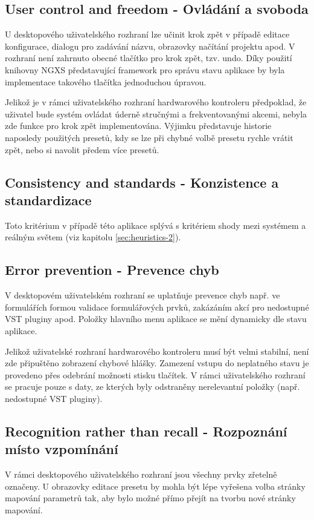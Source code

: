 \documentclass[thesis=M,czech]{FITthesis}[2019/03/06]
\begin{document}
		\subsection{User control and freedom - Ovládání a svoboda}
			U desktopového uživatelského rozhraní lze učinit krok zpět v případě editace konfigurace, dialogu pro zadávání názvu, obrazovky načítání projektu apod. V rozhraní není zahrnuto obecné tlačítko pro krok zpět, tzv. undo. Díky použití knihovny NGXS představující framework pro správu stavu aplikace by byla implementace takového tlačítka jednoduchou úpravou.
			
			Jelikož je v rámci uživatelského rozhraní hardwarového kontroleru předpoklad, že uživatel bude systém ovládat úderně stručnými a frekventovanými akcemi, nebyla zde funkce pro krok zpět implementována. Výjimku představuje historie naposledy použitých presetů, kdy se lze při chybné volbě presetu rychle vrátit zpět, nebo si navolit předem více presetů.
			
		\subsection{Consistency and standards - Konzistence a standardizace}
			Toto kritérium v případě této aplikace splývá s kritériem shody mezi systémem a reálným světem (viz kapitolu \ref{sec:heuristics-2}).
		
		\subsection{Error prevention - Prevence chyb}
			V desktopovém uživatelském rozhraní se uplatňuje prevence chyb např. ve formulářích formou validace formulářových prvků, zakázáním akcí pro nedostupné VST pluginy apod. Položky hlavního menu aplikace se mění dynamicky dle stavu aplikace.
			
			Jelikož uživatelské rozhraní hardwarového kontroleru musí být velmi stabilní, není zde připuštěno zobrazení chybové hlášky. Zamezení vstupu do neplatného stavu je provedeno přes odebrání možnosti stisku tlačítek.
			V rámci uživatelského rozhraní se pracuje pouze s daty, ze kterých byly odstraněny nerelevantní položky
			(např. nedostupné VST pluginy).
					
		\subsection{Recognition rather than recall - Rozpoznání místo vzpomínání}
			V rámci desktopového uživatelského rozhraní jsou všechny prvky zřetelně označeny. U obrazovky editace presetu by mohla být lépe vyřešena volba stránky mapování parametrů tak, aby bylo možné přímo přejít na tvorbu nové stránky mapování.
			
\end{document}
